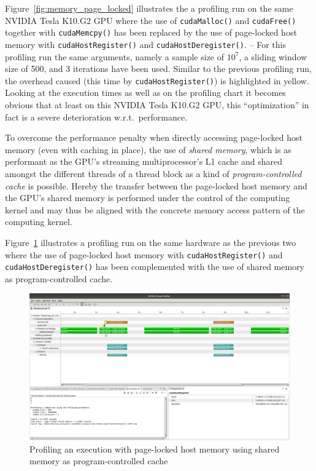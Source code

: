 Figure~\ref{fig:memory_page_locked} illustrates the a profiling run on the same NVIDIA Tesla K10.G2 GPU where the use of \texttt{cudaMalloc()} and \texttt{cudaFree()} together with \texttt{cudaMemcpy()} has been replaced by the use of page-locked host memory with \texttt{cudaHostRegister()} and \texttt{cudaHostDeregister()}. -- For this profiling run the same arguments, namely a sample size of $10^7$, a sliding window size of 500, and 3 iterations have been used. Similar to the previous profiling run, the overhead caused (this time by \texttt{cudaHostRegister()}) is highlighted in yellow. Looking at the execution times as well as on the profiling chart it becomes obvious that at least on this NVIDIA Tesla K10.G2 GPU, this ``optimization'' in fact is a severe deterioration w.r.t.\ performance.

To overcome the performance penalty when directly accessing page-locked host memory (even with caching in place), the use of \emph{shared memory}, which is as performant as the GPU's streaming multiprocessor's L1 cache and shared amongst the different threads of a thread block as a kind of \emph{program-controlled cache} is possible. Hereby the transfer between the page-locked host memory and the GPU's shared memory is performed under the control of the computing kernel and may thus be aligned with the concrete memory access pattern of the computing kernel.

Figure~\ref{fig:memory_shared} illustrates a profiling run on the same hardware as the previous two where the use of page-locked host memory with \texttt{cudaHostRegister()} and \texttt{cudaHostDeregister()} has been complemented with the use of shared memory as program-controlled cache.

\begin{figure}[h]
    \centering
    \includegraphics[width=0.8\linewidth]{Figures/memory_shared}
    \caption{Profiling an execution with page-locked host memory using shared memory as program-controlled cache\label{fig:memory_shared}}
\end{figure}

